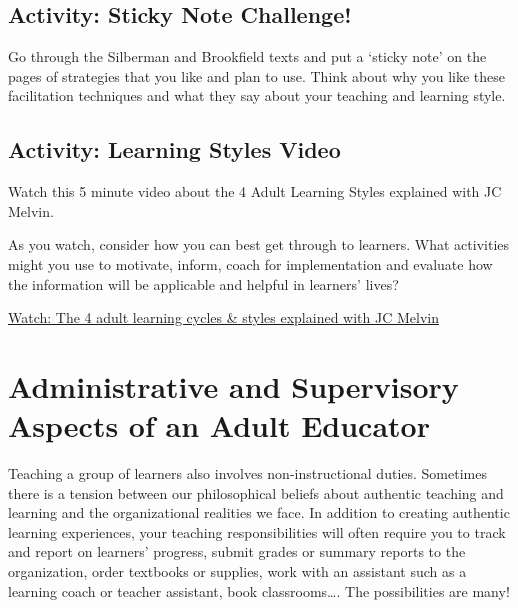 \documentclass[
]{book}
\begin{document}
\hypertarget{activity-sticky-note-challenge}{%
\subsection*{Activity: Sticky Note Challenge!}\label{activity-sticky-note-challenge}}

\begin{reflect}
Go through the Silberman and Brookfield texts and put a `sticky note' on
the pages of strategies that you like and plan to use. Think about why
you like these facilitation techniques and what they say about your
teaching and learning style.
\end{reflect}

\hypertarget{activity-learning-styles-video}{%
\subsection*{Activity: Learning Styles Video}\label{activity-learning-styles-video}}

\begin{reflect}
Watch this 5 minute video about the 4 Adult Learning Styles explained
with JC Melvin.

As you watch, consider how you can best get through to learners. What
activities might you use to motivate, inform, coach for implementation
and evaluate how the information will be applicable and helpful in
learners' lives?

\href{https://www.youtube.com/watch?v=5mApEVWZESA}{Watch: The 4 adult
learning cycles \& styles explained with JC Melvin}
\end{reflect}

\hypertarget{administrative-and-supervisory-aspects-of-an-adult-educator}{%
\section{Administrative and Supervisory Aspects of an Adult Educator}\label{administrative-and-supervisory-aspects-of-an-adult-educator}}

Teaching a group of learners also involves non-instructional duties. Sometimes there is a tension between our philosophical beliefs about authentic teaching and learning and the organizational realities we face. In addition to creating authentic learning experiences, your teaching responsibilities will often require you to track and report on learners' progress, submit grades or summary reports to the organization, order textbooks or supplies, work with an assistant such as a learning coach or teacher assistant, book classrooms\ldots. The possibilities are many!
\end{document}
